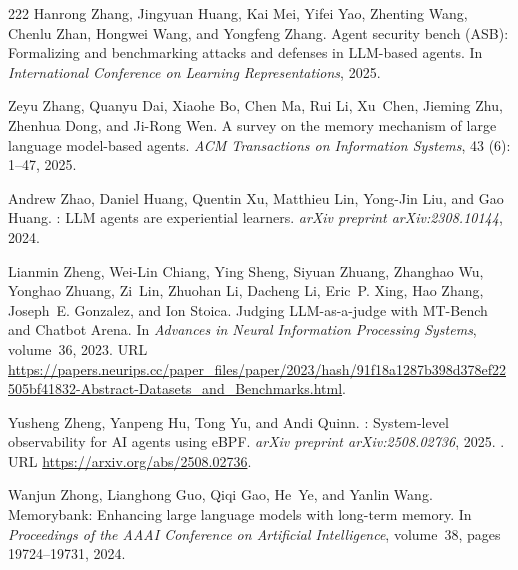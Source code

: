 \begin{thebibliography}{222}
Hanrong Zhang, Jingyuan Huang, Kai Mei, Yifei Yao, Zhenting Wang, Chenlu Zhan,
  Hongwei Wang, and Yongfeng Zhang.
\newblock Agent security bench ({ASB}): Formalizing and benchmarking attacks
  and defenses in {LLM}-based agents.
\newblock In \emph{International Conference on Learning Representations},
  2025{}.

Zeyu Zhang, Quanyu Dai, Xiaohe Bo, Chen Ma, Rui Li, Xu~Chen, Jieming Zhu,
  Zhenhua Dong, and Ji-Rong Wen.
\newblock A survey on the memory mechanism of large language model-based
  agents.
\newblock \emph{ACM Transactions on Information Systems}, 43
  (6): 1--47, 2025{}.

Andrew Zhao, Daniel Huang, Quentin Xu, Matthieu Lin, Yong-Jin Liu, and Gao
  Huang.
: {LLM} agents are experiential learners.
\newblock \emph{arXiv preprint arXiv:2308.10144}, 2024.

Lianmin Zheng, Wei-Lin Chiang, Ying Sheng, Siyuan Zhuang, Zhanghao Wu, Yonghao
  Zhuang, Zi~Lin, Zhuohan Li, Dacheng Li, Eric~P. Xing, Hao Zhang, Joseph~E.
  Gonzalez, and Ion Stoica.
\newblock Judging {LLM}-as-a-judge with {MT-Bench} and {Chatbot Arena}.
\newblock In \emph{Advances in Neural Information Processing Systems},
  volume~36, 2023.
\newblock URL
  \url{https://papers.neurips.cc/paper_files/paper/2023/hash/91f18a1287b398d378ef22505bf41832-Abstract-Datasets_and_Benchmarks.html}.

Yusheng Zheng, Yanpeng Hu, Tong Yu, and Andi Quinn.
: System-level observability for {AI} agents using
  {eBPF}.
\newblock \emph{arXiv preprint arXiv:2508.02736}, 2025.
\newblock {}.
\newblock URL \url{https://arxiv.org/abs/2508.02736}.

Wanjun Zhong, Lianghong Guo, Qiqi Gao, He~Ye, and Yanlin Wang.
\newblock Memorybank: Enhancing large language models with long-term memory.
\newblock In \emph{Proceedings of the AAAI Conference on Artificial
  Intelligence}, volume~38, pages 19724--19731, 2024.


\end{thebibliography}
